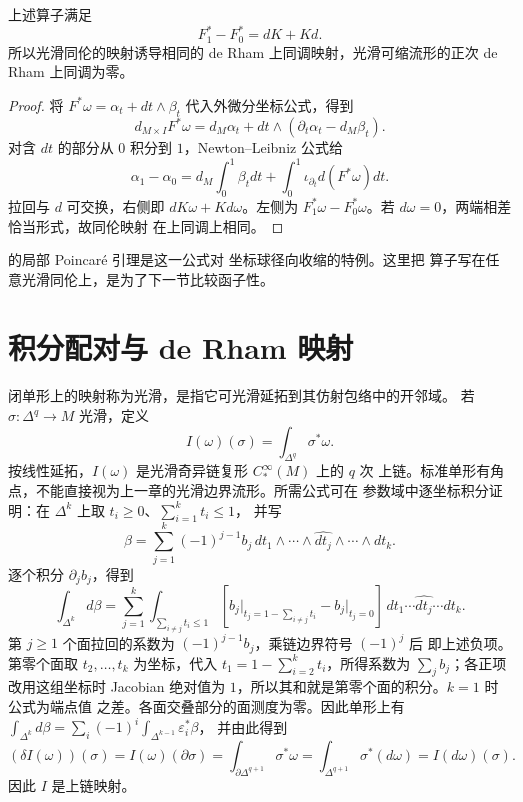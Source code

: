\begin{theorem}[同伦公式]\label{thm:de-rham-homotopy-formula}
上述算子满足
\begin{equation}\label{eq:de-rham-homotopy-formula}
 F_1^*-F_0^*=dK+Kd.
\end{equation}
所以光滑同伦的映射诱导相同的 de Rham 上同调映射，光滑可缩流形的正次
de Rham 上同调为零。
\end{theorem}
\begin{proof}
将 $F^*\omega=\alpha_t+dt\wedge\beta_t$ 代入外微分坐标公式，得到
\[
 d_{M\times I}F^*\omega
 =d_M\alpha_t+dt\wedge(\partial_t\alpha_t-d_M\beta_t).
\]
对含 $dt$ 的部分从 $0$ 积分到 $1$，Newton--Leibniz 公式给
\[
 \alpha_1-\alpha_0
 =d_M\int_0^1\beta_tdt
 +\int_0^1\iota_{\partial_t}d(F^*\omega)dt.
\]
拉回与 $d$ 可交换，右侧即 $dK\omega+Kd\omega$。左侧为
$F_1^*\omega-F_0^*\omega$。若 $d\omega=0$，两端相差恰当形式，故同伦映射
在上同调上相同。
\end{proof}

的局部 Poincaré 引理是这一公式对
坐标球径向收缩的特例。这里把
算子写在任意光滑同伦上，是为了下一节比较函子性。

\section{积分配对与 de Rham 映射}

闭单形上的映射称为光滑，是指它可光滑延拓到其仿射包络中的开邻域。
若 $\sigma:\Delta^q\to M$ 光滑，定义
\[
 I(\omega)(\sigma)=\int_{\Delta^q}\sigma^*\omega.
\]
按线性延拓，$I(\omega)$ 是光滑奇异链复形 $C_*^\infty(M)$ 上的 $q$ 次
上链。标准单形有角点，不能直接视为上一章的光滑边界流形。所需公式可在
参数域中逐坐标积分证明：在 $\Delta^k$ 上取 $t_i\geq0$、$\sum_{i=1}^kt_i\leq1$，
并写
\[
 \beta=\sum_{j=1}^k(-1)^{j-1}b_j\,
 dt_1\wedge\cdots\wedge\widehat{dt_j}\wedge\cdots\wedge dt_k.
\]
逐个积分 $\partial_jb_j$，得到
\[
 \int_{\Delta^k}d\beta
 =\sum_{j=1}^k\int_{\sum_{i\ne j}t_i\leq1}
 \left[b_j\big|_{t_j=1-\sum_{i\ne j}t_i}
       -b_j\big|_{t_j=0}\right]\,dt_1\cdots\widehat{dt_j}\cdots dt_k.
\]
第 $j\geq1$ 个面拉回的系数为 $(-1)^{j-1}b_j$，乘链边界符号 $(-1)^j$ 后
即上述负项。第零个面取 $t_2,\ldots,t_k$ 为坐标，代入
$t_1=1-\sum_{i=2}^kt_i$，所得系数为 $\sum_jb_j$；各正项改用这组坐标时
Jacobian 绝对值为 $1$，所以其和就是第零个面的积分。$k=1$ 时公式为端点值
之差。各面交叠部分的面测度为零。因此单形上有
$\int_{\Delta^k}d\beta=\sum_i(-1)^i\int_{\Delta^{k-1}}\varepsilon_i^*\beta$，
并由此得到
\begin{equation}\label{eq:de-rham-integration-chain-map}
 (\delta I(\omega))(\sigma)
 =I(\omega)(\partial\sigma)
 =\int_{\partial\Delta^{q+1}}\sigma^*\omega
 =\int_{\Delta^{q+1}}\sigma^*(d\omega)
 =I(d\omega)(\sigma).
\end{equation}
因此 $I$ 是上链映射。

